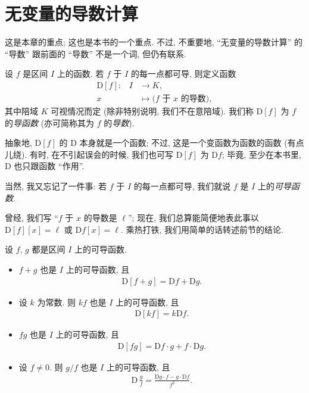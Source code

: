 \section{无变量的导数计算}

这是本章的重点; 这也是本书的一个重点. 不过, 不重要地, ``无变量的导数计算'' 的 ``导数'' 跟前面的 ``导数'' 不是一个词, 但仍有联系.

\begin{definition}
    设 $f$ 是区间 $I$ 上的函数. 若 $f$ 于 $I$ 的每一点都可导, 则定义函数
    \begin{align*}
        \text{$\mathrm{D}[f]$:} \quad
        I & \to K,                          \\
        x & \mapsto \text{($f$ 于 $x$ 的导数)},
    \end{align*}
    其中陪域 $K$ 可视情况而定 (除非特别说明, 我们不在意陪域). 我们称 $\mathrm{D}[f]$ 为 $f$ 的\emph{导函数} (亦可简称其为 $f$ 的\emph{导数}).
\end{definition}

抽象地, $\mathrm{D}[f]$ 的 $\mathrm{D}$ 本身就是一个函数; 不过, 这是一个变函数为函数的函数 (有点儿绕). 有时, 在不引起误会的时候, 我们也可写 $\mathrm{D}[f]$ 为 $\mathrm{D}f$; 毕竟, 至少在本书里, $\mathrm{D}$ 也只跟函数 ``作用''.

当然, 我又忘记了一件事: 若 $f$ 于 $I$ 的每一点都可导, 我们就说 $f$ 是 $I$ 上的\emph{可导函数}.

曾经, 我们写 ``$f$ 于 $x$ 的导数是 $\ell$''; 现在, 我们总算能简便地表此事以 $\mathrm{D}[f][x] = \ell$ 或 $\mathrm{D}f[x] = \ell$. 乘热打铁, 我们用简单的话转述前节的结论.

\begin{theorem}
    设 $f$, $g$ 都是区间 $I$ 上的可导函数.
    \begin{itemize}
        \item $f + g$ 也是 $I$ 上的可导函数, 且
              \begin{align*}
                  \mathrm{D} [f + g] = \mathrm{D} f + \mathrm{D} g.
              \end{align*}
        \item 设 $k$ 为常数. 则 $kf$ 也是 $I$ 上的可导函数, 且
              \begin{align*}
                  \mathrm{D} [kf] = k\mathrm{D} f.
              \end{align*}
        \item $fg$ 也是 $I$ 上的可导函数, 且
              \begin{align*}
                  \mathrm{D} [fg] = \mathrm{D} f \cdot g + f \cdot \mathrm{D} g.
              \end{align*}
        \item 设 $f \neq 0$. 则 $g/f$ 也是 $I$ 上的可导函数, 且
              \begin{align*}
                  \mathrm{D}\, \frac{g}{f} = \frac{\mathrm{D} g \cdot f - g \cdot \mathrm{D} f}{f^2}.
              \end{align*}
    \end{itemize}
\end{theorem}

